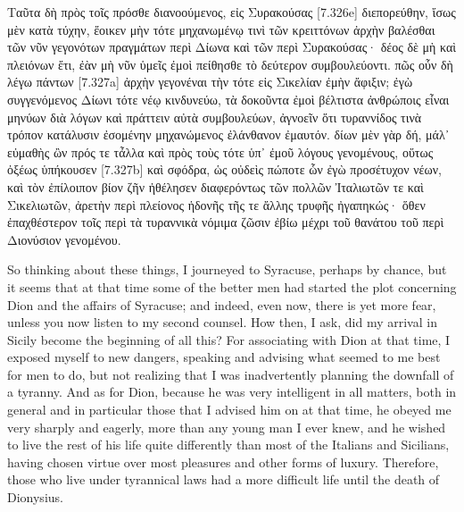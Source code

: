 \documentclass[12pt]{book}
\begin{document}
\Columns
\begin{pairs}
\begin{Rightside}
\begin{Ancient Greek}
\beginnumbering
\pstart
Ταῦτα δὴ πρὸς τοῖς πρόσθε διανοούμενος, εἰς Συρακούσας [7.326e] διεπορεύθην, ἴσως μὲν κατὰ τύχην, ἔοικεν μὴν τότε μηχανωμένῳ τινὶ τῶν κρειττόνων ἀρχὴν βαλέσθαι τῶν νῦν γεγονότων πραγμάτων περὶ Δίωνα καὶ τῶν περὶ Συρακούσας· δέος δὲ μὴ καὶ πλειόνων ἔτι, ἐὰν μὴ νῦν ὑμεῖς ἐμοὶ πείθησθε τὸ δεύτερον συμβουλεύοντι. πῶς οὖν δὴ λέγω πάντων [7.327a] ἀρχὴν γεγονέναι τὴν τότε εἰς Σικελίαν ἐμὴν ἄφιξιν; ἐγὼ συγγενόμενος Δίωνι τότε νέῳ κινδυνεύω, τὰ δοκοῦντα ἐμοὶ βέλτιστα ἀνθρώποις εἶναι μηνύων διὰ λόγων καὶ πράττειν αὐτὰ συμβουλεύων, ἀγνοεῖν ὅτι τυραννίδος τινὰ τρόπον κατάλυσιν ἐσομένην μηχανώμενος ἐλάνθανον ἐμαυτόν. δίων μὲν γὰρ δή, μάλ᾽ εὐμαθὴς ὢν πρός τε τἆλλα καὶ πρὸς τοὺς τότε ὑπ᾽ ἐμοῦ λόγους γενομένους, οὕτως ὀξέως ὑπήκουσεν [7.327b] καὶ σφόδρα, ὡς οὐδεὶς πώποτε ὧν ἐγὼ προσέτυχον νέων, καὶ τὸν ἐπίλοιπον βίον ζῆν ἠθέλησεν διαφερόντως τῶν πολλῶν Ἰταλιωτῶν τε καὶ Σικελιωτῶν, ἀρετὴν περὶ πλείονος ἡδονῆς τῆς τε ἄλλης τρυφῆς ἠγαπηκώς· ὅθεν ἐπαχθέστερον τοῖς περὶ τὰ τυραννικὰ νόμιμα ζῶσιν ἐβίω μέχρι τοῦ θανάτου τοῦ περὶ Διονύσιον γενομένου.	
\pend
\endnumbering
\end{Ancient Greek}
\end{Rightside}
\begin{Leftside}
\begin{English}
\beginnumbering
\pstart
So thinking about these things, I journeyed to Syracuse, perhaps by chance, but it seems that at that time some of the better men had started the plot concerning Dion and the affairs of Syracuse; and indeed, even now, there is yet more fear, unless you now listen to my second counsel. How then, I ask, did my arrival in Sicily become the beginning of all this? For associating with Dion at that time, I exposed myself to new dangers, speaking and advising what seemed to me best for men to do, but not realizing that I was inadvertently planning the downfall of a tyranny. And as for Dion, because he was very intelligent in all matters, both in general and in particular those that I advised him on at that time, he obeyed me very sharply and eagerly, more than any young man I ever knew, and he wished to live the rest of his life quite differently than most of the Italians and Sicilians, having chosen virtue over most pleasures and other forms of luxury. Therefore, those who live under tyrannical laws had a more difficult life until the death of Dionysius.
\pend
\endnumbering
\end{English}
\end{Leftside}
\end{pairs}
\end{document}
